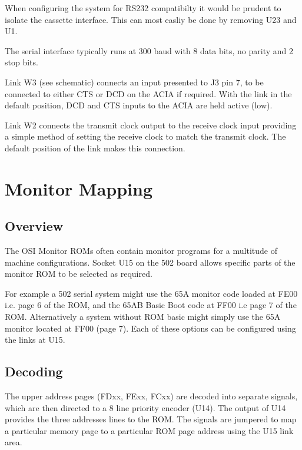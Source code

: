 When configuring the system for RS232 compatibilty it would be prudent to isolate the cassette interface. This can most easliy be done by removing U23 and U1.

The serial interface typically runs at 300 baud with 8 data bits, no parity and 2 stop bits.

Link W3 (see schematic) connects an input presented to J3 pin 7, to be connected to either CTS or DCD on the ACIA if required. With the link in the default position, DCD and CTS inputs to the ACIA are held active (low). 

Link W2 connects the transmit clock output to the receive clock input providing a simple method of setting the receive clock to match the transmit clock. The default position of the link makes this connection.

\section{Monitor Mapping}

\subsection{Overview}

The OSI Monitor ROMs often contain monitor programs for a multitude of machine configurations. Socket U15 on the 502 board allows specific parts of the monitor ROM to be selected as required.

For example a 502 serial system might use the 65A monitor code loaded at FE00 i.e. page 6 of the ROM, and the 65AB Basic Boot code at FF00 i.e page 7 of the ROM. Alternatively a system without ROM basic might simply use the 65A monitor located at FF00 (page 7). Each of these options can be configured using the links at U15.

\subsection{Decoding}

The upper address pages (FDxx, FExx, FCxx) are decoded into separate signals, which are then directed to a 8 line priority encoder (U14). The output of U14 provides the three addresses lines to the ROM. The signals are jumpered to map a particular memory page to a particular ROM page address using the U15 link area.

